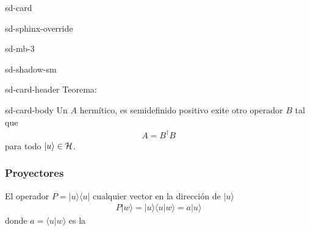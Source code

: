 \documentclass[letterpaper,10pt,english]{jupyterBook}
\newcommand{\ket}[1]{|#1\rangle}
\newcommand{\braket}[2]{\langle #1|#2\rangle}
\newcommand{\ketbra}[2]{| #1\rangle \langle #2 |}
\newcommand{\Hil}{{\cal H}}
\begin{document}
\begin{sphinxuseclass}{sd-card}
\begin{sphinxuseclass}{sd-sphinx-override}
\begin{sphinxuseclass}{sd-mb-3}
\begin{sphinxuseclass}{sd-shadow-sm}
\begin{sphinxuseclass}{sd-card-header}
\sphinxAtStartPar
Teorema:

\end{sphinxuseclass}
\begin{sphinxuseclass}{sd-card-body}
\sphinxAtStartPar
Un \(A\) hermítico, es semi\sphinxhyphen{}definido positivo    exite otro operador \(B\) tal que
\begin{equation*}
\begin{split}   
A = B^\dagger B
\end{split}
\end{equation*}
\sphinxAtStartPar
para todo \(\ket{u}\in \Hil\).

\end{sphinxuseclass}
\end{sphinxuseclass}
\end{sphinxuseclass}
\end{sphinxuseclass}
\end{sphinxuseclass}
\sphinxAtStartPar



\subsubsection{Proyectores}
\label{\detokenize{docs/Part_01_Formalismo/Chapter_01_02_Formalismo_matem_xe1tico/01_03_Operadores_myst:proyectores}}
\sphinxAtStartPar
El operador \(P = \ketbra{u}{u}\)  cualquier vector en la dirección de \(\ket{u}\)
\begin{equation*}
\begin{split}
P \ket{w} = \ket{u}\braket{u}{w} = a \ket{u}
\end{split}
\end{equation*}
\sphinxAtStartPar
donde \(a = \braket{u}{w}\) es la 
\end{document}
